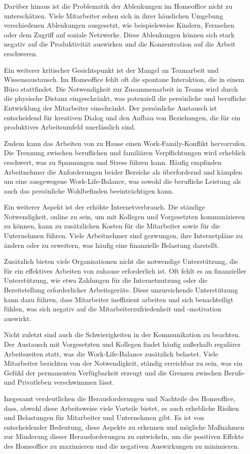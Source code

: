 Darüber hinaus ist die Problematik der Ablenkungen im Homeoffice nicht zu unterschätzen. Viele Mitarbeiter sehen sich in ihrer häuslichen Umgebung verschiedenen Ablenkungen ausgesetzt, wie beispielsweise Kindern, Fernsehen oder dem Zugriff auf soziale Netzwerke. Diese Ablenkungen können sich stark negativ auf die Produktivität auswirken und die Konzentration auf die Arbeit erschweren\cite{file4}.

Ein weiterer kritischer Gesichtspunkt ist der Mangel an Teamarbeit und Wissensaustausch. Im Homeoffice fehlt oft die spontane Interaktion, die in einem Büro stattfindet. Die Notwendigkeit zur Zusammenarbeit in Teams wird durch die physische Distanz eingeschränkt, was potenziell die persönliche und berufliche Entwicklung der Mitarbeiter einschränkt. Der persönliche Austausch ist entscheidend für kreativen Dialog und den Aufbau von Beziehungen, die für ein produktives Arbeitsumfeld unerlässlich sind\cite{file4}.

Zudem kann das Arbeiten von zu Hause einen Work-Family-Konflikt hervorrufen. Die Trennung zwischen beruflichen und familiären Verpflichtungen wird erheblich erschwert, was zu Spannungen und Stress führen kann. Häufig empfinden Arbeitnehmer die Anforderungen beider Bereiche als überfordernd und kämpfen um eine ausgewogene Work-Life-Balance, was sowohl die berufliche Leistung als auch das persönliche Wohlbefinden beeinträchtigen kann\cite{file7}.

Ein weiterer Aspekt ist der erhöhte Internetverbrauch. Die ständige Notwendigkeit, online zu sein, um mit Kollegen und Vorgesetzten kommunizieren zu können, kann zu zusätzlichen Kosten für die Mitarbeiter sowie für die Unternehmen führen\cite{file7}. Viele Arbeitnehmer sind gezwungen, ihre Internetpläne zu ändern oder zu erweitern, was häufig eine finanzielle Belastung darstellt.

Zusätzlich bieten viele Organisationen nicht die notwendige Unterstützung, die für ein effektives Arbeiten von zuhause erforderlich ist. Oft fehlt es an finanzieller Unterstützung, wie etwa Zahlungen für die Internetnutzung oder die Bereitstellung erforderlicher Arbeitsgeräte\cite{file7}. Diese unzureichende Unterstützung kann dazu führen, dass Mitarbeiter ineffizient arbeiten und sich benachteiligt fühlen, was sich negativ auf die Mitarbeiterzufriedenheit und -motivation auswirkt.

Nicht zuletzt sind auch die Schwierigkeiten in der Kommunikation zu beachten. Der Austausch mit Vorgesetzten und Kollegen findet häufig außerhalb regulärer Arbeitszeiten statt, was die Work-Life-Balance zusätzlich belastet. Viele Mitarbeiter berichten von der Notwendigkeit, ständig erreichbar zu sein, was ein Gefühl der permanenten Verfügbarkeit erzeugt und die Grenzen zwischen Berufs- und Privatleben verschwimmen lässt\cite{file4}.

Insgesamt verdeutlichen die Herausforderungen und Nachteile des Homeoffice, dass, obwohl diese Arbeitsweise viele Vorteile bietet, es auch erhebliche Risiken und Belastungen für Mitarbeiter und Unternehmen gibt. Es ist von entscheidender Bedeutung, diese Aspekte zu erkennen und mögliche Maßnahmen zur Minderung dieser Herausforderungen zu entwickeln, um die positiven Effekte des Homeoffice zu maximieren und die negativen Auswirkungen zu minimieren.